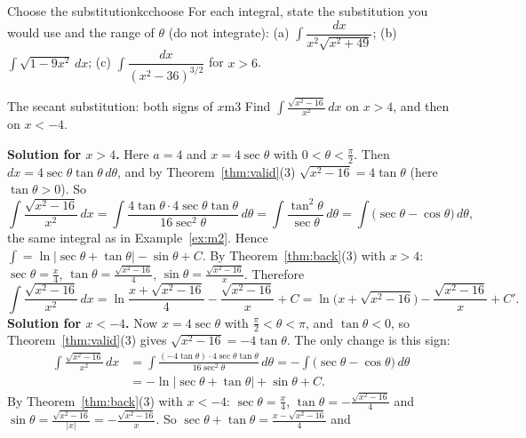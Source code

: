 \documentclass[11pt]{article}
\begin{document}
\begin{kc}{Choose the substitution}{kcchoose}
For each integral, state the substitution you would use and the range of $\theta$ (do not integrate): \textup{(a)} $\int\dfrac{dx}{x^2\sqrt{x^2+49}}$; \textup{(b)} $\int\sqrt{1-9x^2}\,dx$; \textup{(c)} $\int\dfrac{dx}{(x^2-36)^{3/2}}$ for $x>6$.
\end{kc}

\begin{exmp}{The secant substitution: both signs of $x$}{m3}
Find $\displaystyle\int\frac{\sqrt{x^2-16}}{x^2}\,dx$ on $x>4$, and then on $x<-4$.

\textbf{Solution for $x>4$.} Here $a=4$ and $x=4\sec\theta$ with $0<\theta<\frac\pi2$. Then $dx=4\sec\theta\tan\theta\,d\theta$, and by Theorem~\ref{thm:valid}(3) $\sqrt{x^2-16}=4\tan\theta$ (here $\tan\theta>0$). So
\[\int\frac{\sqrt{x^2-16}}{x^2}\,dx=\int\frac{4\tan\theta\cdot4\sec\theta\tan\theta}{16\sec^2\theta}\,d\theta=\int\frac{\tan^2\theta}{\sec\theta}\,d\theta=\int\big(\sec\theta-\cos\theta\big)\,d\theta ,\]
the same integral as in Example~\ref{ex:m2}. Hence $\int=\ln\lvert\sec\theta+\tan\theta\rvert-\sin\theta+C$. By Theorem~\ref{thm:back}(3) with $x>4$: $\sec\theta=\frac x4$, $\tan\theta=\frac{\sqrt{x^2-16}}4$, $\sin\theta=\frac{\sqrt{x^2-16}}x$. Therefore
\[\int\frac{\sqrt{x^2-16}}{x^2}\,dx=\ln\frac{x+\sqrt{x^2-16}}4-\frac{\sqrt{x^2-16}}x+C=\ln\big(x+\sqrt{x^2-16}\big)-\frac{\sqrt{x^2-16}}x+C' .\]
\textbf{Solution for $x<-4$.} Now $x=4\sec\theta$ with $\frac\pi2<\theta<\pi$, and $\tan\theta<0$, so Theorem~\ref{thm:valid}(3) gives $\sqrt{x^2-16}=-4\tan\theta$. The only change is this sign:
\begin{align*}
\int\frac{\sqrt{x^2-16}}{x^2}\,dx&=\int\frac{(-4\tan\theta)\cdot4\sec\theta\tan\theta}{16\sec^2\theta}\,d\theta=-\int\big(\sec\theta-\cos\theta\big)\,d\theta\\
&=-\ln\lvert\sec\theta+\tan\theta\rvert+\sin\theta+C .
\end{align*}
By Theorem~\ref{thm:back}(3) with $x<-4$: $\sec\theta=\frac x4$, $\tan\theta=-\frac{\sqrt{x^2-16}}4$ and $\sin\theta=\frac{\sqrt{x^2-16}}{\lvert x\rvert}=-\frac{\sqrt{x^2-16}}x$. So $\sec\theta+\tan\theta=\frac{x-\sqrt{x^2-16}}4$ and

\end{exmp}
\end{document}
